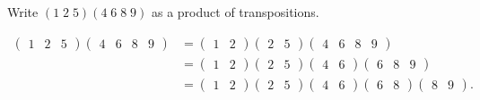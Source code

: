 
\begin{example}
    Write
    $
        (1\;2\;5)(4\;6\;8\;9)
    $
    as a product of transpositions.
\end{example}

\begin{solution}
    \begin{align*}
        \begin{pmatrix}
            1 & 2 & 5
        \end{pmatrix}
        \begin{pmatrix}
            4 & 6 & 8 & 9
        \end{pmatrix}
        &=
        \begin{pmatrix}
            1 & 2
        \end{pmatrix}
        \begin{pmatrix}
            2 & 5
        \end{pmatrix}
        \begin{pmatrix}
            4 & 6 & 8 & 9
        \end{pmatrix}
        \\
        &=
        \begin{pmatrix}
            1 & 2
        \end{pmatrix}
        \begin{pmatrix}
            2 & 5
        \end{pmatrix}
        \begin{pmatrix}
            4 & 6
        \end{pmatrix}
        \begin{pmatrix}
            6 & 8 & 9
        \end{pmatrix}
        \\
        &=
        \begin{pmatrix}
            1 & 2
        \end{pmatrix}
        \begin{pmatrix}
            2 & 5
        \end{pmatrix}
        \begin{pmatrix}
            4 & 6
        \end{pmatrix}
        \begin{pmatrix}
            6 & 8
        \end{pmatrix}
        \begin{pmatrix}
            8 & 9
        \end{pmatrix}
        .
    \end{align*}
\end{solution}

